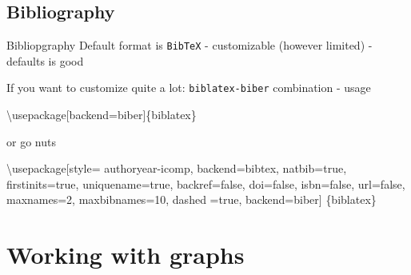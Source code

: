 \documentclass[ignorenonframetext,]{beamer}
\newenvironment{Shaded}{\begin{snugshade}}{\end{snugshade}}
\newcommand{\NormalTok}[1]{{#1}}
\begin{document}
\subsection{Bibliography}

\begin{frame}[fragile]{Bibliopgraphy}
Default format is \texttt{BibTeX} - customizable (however limited) -
defaults is good

If you want to customize quite a lot: \texttt{biblatex-biber}
combination - usage

\begin{Shaded}
\begin{Highlighting}[]
    \NormalTok{\textbackslash{}usepackage[backend=biber]\{biblatex\}}
\end{Highlighting}
\end{Shaded}

\end{frame}

\begin{frame}[fragile]{or go nuts}

\begin{Shaded}
\begin{Highlighting}[]
\NormalTok{\textbackslash{}usepackage[style= authoryear-icomp, }
            \NormalTok{backend=bibtex,}
            \NormalTok{natbib=true, }
            \NormalTok{firstinits=true, }
            \NormalTok{uniquename=true,}
            \NormalTok{backref=false,}
            \NormalTok{doi=false,}
            \NormalTok{isbn=false,}
            \NormalTok{url=false,}
            \NormalTok{maxnames=2, }
            \NormalTok{maxbibnames=10, }
            \NormalTok{dashed =true, }
            \NormalTok{backend=biber]}
\NormalTok{            \{biblatex\}}
\end{Highlighting}
\end{Shaded}

\end{frame}

\section{Working with graphs}\label{better-graphs}
\end{document}
